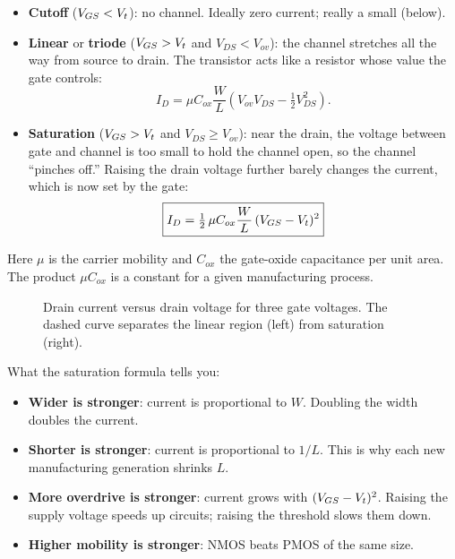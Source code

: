\begin{itemize}
  \item \textbf{Cutoff} ($V_{GS} < V_{t}$): no channel. Ideally zero current; really a small  (below).
  \item \textbf{Linear} or \textbf{triode} ($V_{GS} > V_{t}$ and $V_{DS} < V_{ov}$): the channel stretches all the way from source to drain. The transistor acts like a resistor whose value the gate controls:
  \[
    I_D = \mu C_{ox}\frac{W}{L}\left(V_{ov} V_{DS} - \tfrac12 V_{DS}^2\right).
  \]
  \item \textbf{Saturation} ($V_{GS} > V_{t}$ and $V_{DS} \ge V_{ov}$): near the drain, the voltage between gate and channel is too small to hold the channel open, so the channel ``pinches off.'' Raising the drain voltage further barely changes the current, which is now set by the gate:
  \[
    \boxed{I_D = \tfrac12\,\mu C_{ox}\frac{W}{L}\,(V_{GS} - V_{t})^2}
  \]
\end{itemize}

Here $\mu$ is the carrier mobility and $C_{ox}$ the gate-oxide capacitance per unit area. The product $\mu C_{ox}$ is a constant for a given manufacturing process.

\begin{figure}[h]
\centering
{}
\caption{Drain current versus drain voltage for three gate voltages. The dashed curve separates the linear region (left) from saturation (right).}
\end{figure}

What the saturation formula tells you:
\begin{itemize}
  \item \textbf{Wider is stronger}: current is proportional to $W$. Doubling the width doubles the current.
  \item \textbf{Shorter is stronger}: current is proportional to $1/L$. This is why each new manufacturing generation shrinks $L$.
  \item \textbf{More overdrive is stronger}: current grows with $(V_{GS} - V_{t})^2$. Raising the supply voltage speeds up circuits; raising the threshold slows them down.
  \item \textbf{Higher mobility is stronger}: NMOS beats PMOS of the same size.
\end{itemize}

